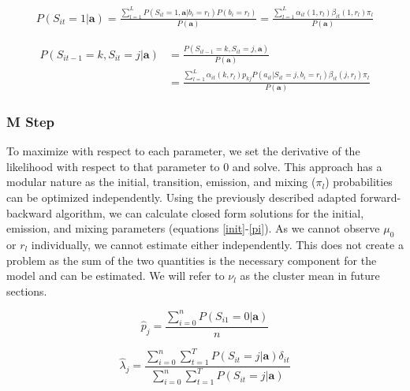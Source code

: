 \documentclass[num-refs]{wiley-article}
\begin{document}
\begin{equation}\label{probs1}
\begin{split}
    P(S_{it}=1|\textbf{a}) = 
    \frac{\sum^L_{l=1}P(S_{it}=1,\textbf{a}|b_{i}=r_l)
        P(b_{i}=r_l)}{P(\textbf{a})} = 
    \frac{\sum^L_{l=1}\alpha_{it}(1,r_l)\beta_{it}(1,r_l)\pi_l }{P(\textbf{a})} 
\end{split}
\end{equation}


\begin{equation}\label{probstran}
\begin{split}
    P(S_{it-1}=k,S_{it}=j|\textbf{a}) & = 
        \frac{P(S_{it-1}=k,S_{it}=j,\textbf{a})}{P(\textbf{a})} \\
    & = \frac{\sum^L_{l=1}\alpha_{it}(k,r_l) p_{kj} P(a_{it}|S_{it}=j, b_i=r_l)
        \beta_{it}(j,r_l)\pi_l }{P(\textbf{a})} 
\end{split}
\end{equation}



\subsubsection{M Step}

 To maximize with respect to each parameter, we set the derivative of the likelihood with respect to that parameter to 0 and solve. This approach has a modular nature as the initial, transition, emission, and mixing ($\pi_l$) probabilities can be optimized independently. Using the previously described adapted forward-backward algorithm, we can calculate closed form solutions for the initial, emission, and mixing parameters (equations \ref{init}-\ref{pi}). As we cannot observe $\mu_0$ or $r_l$ individually, we cannot estimate either independently. This does not create a problem as the sum of the two quantities is the necessary component for the model and can be estimated. We will refer to $\nu_l$ as the cluster mean in future sections. 

\begin{equation}\label{init}
    \hat{p}_j  = \frac{\sum^n_{i=0} P(S_{i1}=0|\textbf{a})}{n}
\end{equation} 

\begin{equation}\label{binom}
    \hat{\lambda}_j  = \frac{\sum^n_{i=0} \sum_{t=1}^T P(S_{it}=j|\textbf{a})\delta_{it}}
                            {\sum^n_{i=0} \sum_{t=1}^TP(S_{it}=j|\textbf{a})}
\end{equation} 
\end{document}
